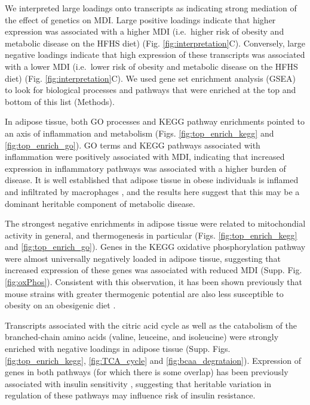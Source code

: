 \documentclass[
]{article}
\begin{document}
We interpreted large loadings onto transcripts as indicating strong
mediation of the effect of genetics on MDI. Large positive loadings
indicate that higher expression was associated with a higher MDI
(i.e.~higher risk of obesity and metabolic disease on the HFHS diet)
(Fig. \ref{fig:interpretation}C). Conversely, large negative loadings
indicate that high expression of these transcripts was associated with a
lower MDI (i.e.~lower risk of obesity and metabolic disease on the HFHS
diet) (Fig. \ref{fig:interpretation}C). We used gene set enrichment
analysis (GSEA) \cite{fgsea, 
pmid16199517} to look for biological processes and pathways that were
enriched at the top and bottom of this list (Methods).

In adipose tissue, both GO processes and KEGG pathway enrichments
pointed to an axis of inflammation and metabolism (Figs.
\ref{fig:top_enrich_kegg} and \ref{fig:top_enrich_go}). GO terms and
KEGG pathways associated with inflammation were positively associated
with MDI, indicating that increased expression in inflammatory pathways
was associated with a higher burden of disease. It is well established
that adipose tissue in obese individuals is inflamed and infiltrated by
macrophages \cite{pmid19133410, 
pmid28955384, pmid28912810, pmid28901330, pmid24969772}, and the results
here suggest that this may be a dominant heritable component of
metabolic disease.

The strongest negative enrichments in adipose tissue were related to
mitochondial activity in general, and thermogenesis in particular (Figs.
\ref{fig:top_enrich_kegg} and \ref{fig:top_enrich_go}). Genes in the
KEGG oxidative phosphorylation pathway were almost universally
negatively loaded in adipose tissue, suggesting that increased
expression of these genes was associated with reduced MDI (Supp. Fig.
\ref{fig:oxPhos}). Consistent with this observation, it has been shown
previously that mouse strains with greater thermogenic potential are
also less susceptible to obesity on an obesigenic diet
\cite{pmid18492779}.

Transcripts associated with the citric acid cycle as well as the
catabolism of the branched-chain amino acids (valine, leuceine, and
isoleucine) were strongly enriched with negative loadings in adipose
tissue (Supp. Figs. \ref{fig:top_enrich_kegg}, \ref{fig:TCA_cycle} and
\ref{fig:bcaa_degrataion}). Expression of genes in both pathways (for
which there is some overlap) has been previously associated with insulin
sensitivity \cite{pmid29567659, 
pmid22560213, pmid19841271}, suggesting that heritable variation in
regulation of these pathways may influence risk of insulin resistance.
\end{document}
